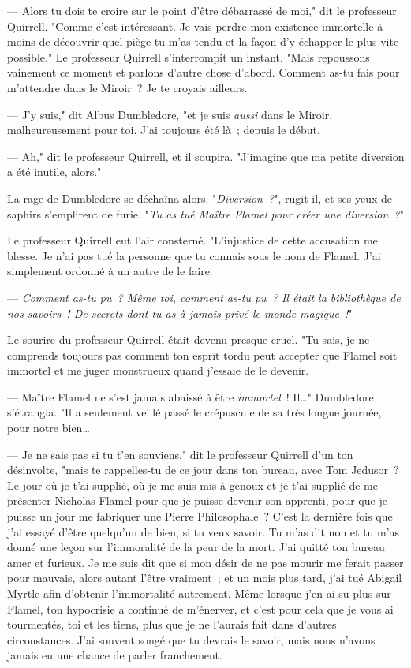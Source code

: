 --- Alors tu dois te croire sur le point d'être débarrassé de moi," dit le professeur Quirrell. "Comme c'est intéressant. Je vais perdre mon existence immortelle à moins de découvrir quel piège tu m'as tendu et la façon d'y échapper le plus vite possible." Le professeur Quirrell s'interrompit un instant. "Mais repoussons vainement ce moment et parlons d'autre chose d'abord. Comment as-tu fais pour m'attendre dans le Miroir~? Je te croyais ailleurs.

--- J'y suis," dit Albus Dumbledore, "et je suis \emph{aussi} dans le Miroir, malheureusement pour toi. J'ai toujours été là~; depuis le début.

--- Ah," dit le professeur Quirrell, et il soupira. "J'imagine que ma petite diversion a été inutile, alors."

La rage de Dumbledore se déchaîna alors. "\emph{Diversion~?}", rugit-il, et ses yeux de saphirs s'emplirent de furie. "\emph{Tu as tué Maître Flamel pour créer une diversion~?}"

Le professeur Quirrell eut l'air consterné. "L'injustice de cette accusation me blesse. Je n'ai pas tué la personne que tu connais sous le nom de Flamel. J'ai simplement ordonné à un autre de le faire.

--- \emph{Comment as-tu pu~? Même toi, comment as-tu pu~? Il était la bibliothèque de nos savoirs~! De secrets dont tu as à jamais privé le monde magique~!}"

Le sourire du professeur Quirrell était devenu presque cruel. "Tu sais, je ne comprends toujours pas comment ton esprit tordu peut accepter que Flamel soit immortel et me juger monstrueux quand j'essaie de le devenir.

--- Maître Flamel ne s'est jamais abaissé à être \emph{immortel}~! Il…" Dumbledore s'étrangla. "Il a seulement veillé passé le crépuscule de sa très longue journée, pour notre bien…

--- Je ne sais pas si tu t'en souviens," dit le professeur Quirrell d'un ton désinvolte, "mais te rappelles-tu de ce jour dans ton bureau, avec Tom Jedusor~? Le jour où je t'ai supplié, où je me suis mis à genoux et je t'ai supplié de me présenter Nicholas Flamel pour que je puisse devenir son apprenti, pour que je puisse un jour me fabriquer une Pierre Philosophale~? C'est la dernière fois que j'ai essayé d'être quelqu'un de bien, si tu veux savoir. Tu m'as dit non et tu m'as donné une leçon sur l'immoralité de la peur de la mort. J'ai quitté ton bureau amer et furieux. Je me suis dit que si mon désir de ne pas mourir me ferait passer pour mauvais, alors autant l'être vraiment~; et un mois plus tard, j'ai tué Abigail Myrtle afin d'obtenir l'immortalité autrement. Même lorsque j'en ai su plus sur Flamel, ton hypocrisie a continué de m'énerver, et c'est pour cela que je vous ai tourmentés, toi et les tiens, plus que je ne l'aurais fait dans d'autres circonstances. J'ai souvent songé que tu devrais le savoir, mais nous n'avons jamais eu une chance de parler franchement.

